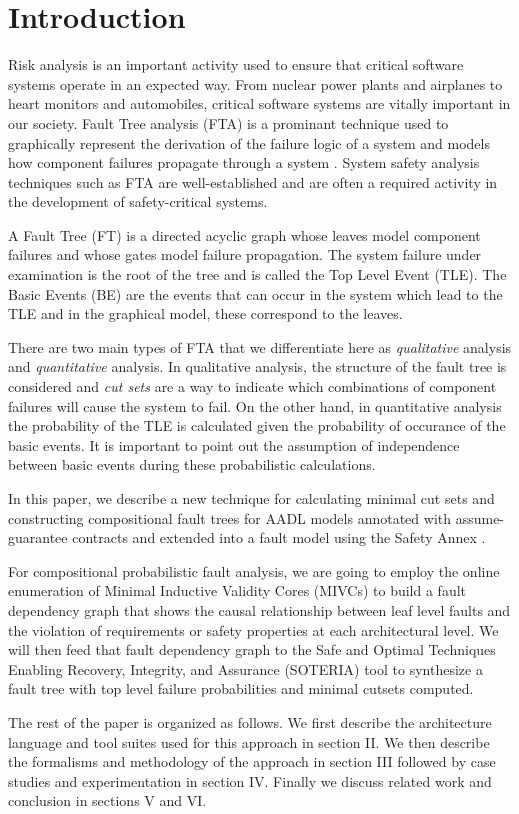 \section{Introduction}
\label{sec:intro}

Risk analysis is an important activity used to ensure that critical software systems operate in an expected way. From nuclear power plants and airplanes to heart monitors and automobiles, critical software systems are vitally important in our society. Fault Tree analysis (FTA) is a prominant technique used to graphically represent the derivation of the failure logic of a system and models how component failures propagate through a system \cite{0f356f05e72f43018211b36f97c8854a}. System safety analysis techniques such as FTA are well-established and are often a required activity in the development of safety-critical systems. 

A Fault Tree (FT) is a directed acyclic graph whose leaves model component failures and whose gates model failure propagation.  The system failure under examination is the root of the tree and is called the Top Level Event (TLE). The Basic Events (BE) are the events that can occur in the system which lead to the TLE and in the graphical model, these correspond to the leaves. 

There are two main types of FTA that we differentiate here as \textit{qualitative} analysis and \textit{quantitative} analysis. In qualitative analysis, the structure of the fault tree is considered and \textit{cut sets} are a way to indicate which combinations of component failures will cause the system to fail. On the other hand, in quantitative analysis the probability of the TLE is calculated given the probability of occurance of the basic events. It is important to point out the assumption of independence between basic events during these probabilistic calculations. 

In this paper, we describe a new technique for calculating minimal cut sets and constructing compositional fault trees for AADL models \cite{AADL_Standard} annotated with assume-guarantee contracts \cite{QFCS15:backes} and extended into a fault model using the Safety Annex \cite{Stewart17:IMBSA,SATechReport}. 

For compositional probabilistic fault analysis, we are going to employ the online enumeration of Minimal Inductive Validity Cores (MIVCs) \cite{GhassabaniGW16,Ghassabani2017EfficientGO} to build a fault dependency graph that shows the causal relationship between leaf level faults and the violation of requirements or safety properties at each architectural level.  We will then feed that fault dependency graph to the Safe and Optimal Techniques Enabling Recovery, Integrity, and Assurance (SOTERIA) tool \cite{SOTERIAproject} to synthesize a fault tree with top level failure probabilities and minimal cutsets computed. 

The rest of the paper is organized as follows. We first describe the architecture language and tool suites used for this approach in section II. We then describe the formalisms and methodology of the approach in section III followed by case studies and experimentation in section IV. Finally we discuss related work and conclusion in sections V and VI.  
